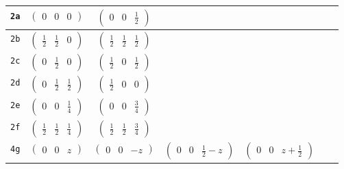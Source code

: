 \documentclass[fleqn,9pt,landscape]{jsarticle}
\begin{document}
\begin{center}
\begin{longtable}{ccccccc}
{\tt 2a} & $ \begin{pmatrix} 0 & 0 & 0 \end{pmatrix} $ & $ \begin{pmatrix} 0 & 0 & \frac{1}{2} \end{pmatrix} $ & $  $ & $  $ & $  $ & $  $ \\ \hline
{\tt 2b} & $ \begin{pmatrix} \frac{1}{2} & \frac{1}{2} & 0 \end{pmatrix} $ & $ \begin{pmatrix} \frac{1}{2} & \frac{1}{2} & \frac{1}{2} \end{pmatrix} $ & $  $ & $  $ & $  $ & $  $ \\ \hline
{\tt 2c} & $ \begin{pmatrix} 0 & \frac{1}{2} & 0 \end{pmatrix} $ & $ \begin{pmatrix} \frac{1}{2} & 0 & \frac{1}{2} \end{pmatrix} $ & $  $ & $  $ & $  $ & $  $ \\ \hline
{\tt 2d} & $ \begin{pmatrix} 0 & \frac{1}{2} & \frac{1}{2} \end{pmatrix} $ & $ \begin{pmatrix} \frac{1}{2} & 0 & 0 \end{pmatrix} $ & $  $ & $  $ & $  $ & $  $ \\ \hline
{\tt 2e} & $ \begin{pmatrix} 0 & 0 & \frac{1}{4} \end{pmatrix} $ & $ \begin{pmatrix} 0 & 0 & \frac{3}{4} \end{pmatrix} $ & $  $ & $  $ & $  $ & $  $ \\ \hline
{\tt 2f} & $ \begin{pmatrix} \frac{1}{2} & \frac{1}{2} & \frac{1}{4} \end{pmatrix} $ & $ \begin{pmatrix} \frac{1}{2} & \frac{1}{2} & \frac{3}{4} \end{pmatrix} $ & $  $ & $  $ & $  $ & $  $ \\ \hline
{\tt 4g} & $ \begin{pmatrix} 0 & 0 & z \end{pmatrix} $ & $ \begin{pmatrix} 0 & 0 & - z \end{pmatrix} $ & $ \begin{pmatrix} 0 & 0 & \frac{1}{2} - z \end{pmatrix} $ & $ \begin{pmatrix} 0 & 0 & z + \frac{1}{2} \end{pmatrix} $ & $  $ & $  $ \\ \hline

\end{longtable}
\end{center}
\end{document}
